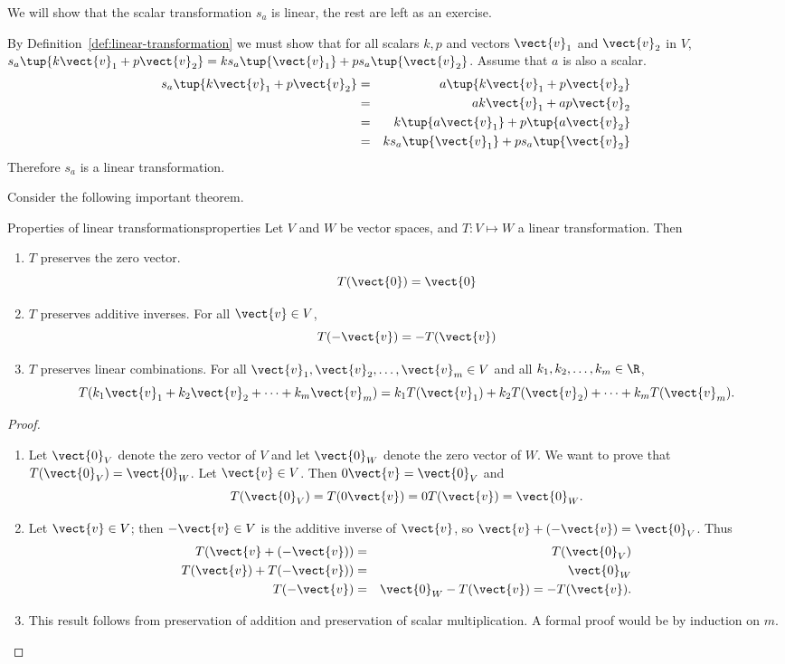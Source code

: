 \begin{solution}
We will show that the scalar transformation $s_a$ is linear, the rest are left as an exercise. 

By Definition~\ref{def:linear-transformation} we must show that for all scalars $k ,p $ and 
vectors $\vect{v}_1$ and $\vect{v}_2$ in $V$, $s_a\tup{k \vect{v}_1 + p \vect{v}_2 } = k s_a\tup{\vect{v}_1}+ p s_a\tup{\vect{v}_{2} }$. Assume that $a$ is also a scalar. 
\begin{eqnarray*}
s_a\tup{k \vect{v}_1 + p \vect{v}_2 } &=& a \tup{k \vect{v}_1 + p \vect{v}_2 } \\
&=&  ak \vect{v}_1 + ap \vect{v}_2  \\
 &=&  k \tup{a \vect{v}_1} + p\tup{a \vect{v}_2}  \\
&=& k s_a\tup{\vect{v}_1 }  + p s_a \tup{\vect{v}_2 }
\end{eqnarray*}
Therefore $s_a$ is a linear transformation.
\end{solution}

Consider the following important theorem.

\begin{theorem}{Properties of linear transformations}{properties}
Let $V$ and $W$ be vector spaces, and $T:V \mapsto W$ a linear
transformation. 
Then
\begin{enumerate}
\item $T$ preserves the zero vector.
\[
T(\vect{0})=\vect{0}
\]
\item $T$ preserves additive inverses. 
For all $\vect{v}\in V$, 
\[
T(-\vect{v})= -T(\vect{v})
\]
\item $T$ preserves linear combinations.
For all $\vect{v}_1, \vect{v}_2, \ldots, \vect{v}_m \in V$ and
all $k_1, k_2, \ldots, k_m\in\R$,
\[ T(k_1\vect{v}_1 + k_2\vect{v}_2 + \cdots + k_m\vect{v}_m)
= k_1T(\vect{v}_1) + k_2T(\vect{v}_2) + \cdots + k_mT(\vect{v}_m).\]
\end{enumerate}
\end{theorem}

\begin{proof}
\begin{enumerate}
\item Let $\vect{0}_V$ denote the zero vector of $V$ and let
$\vect{0}_W$ denote the zero vector of $W$.
We want to prove that $T(\vect{0}_V)=\vect{0}_W$.
Let $\vect{v}\in V$. 
Then $0\vect{v}=\vect{0}_V$ and
\[ T(\vect{0}_V)=T(0\vect{v})=0T(\vect{v})=\vect{0}_W.\]
\item
Let $\vect{v}\in V$; then $-\vect{v}\in V$ is the additive
inverse of $\vect{v}$, so $\vect{v} + (-\vect{v})=\vect{0}_V$.
Thus
\begin{eqnarray*}
T(\vect{v} + (-\vect{v})) & = & T(\vect{0}_V) \\
T(\vect{v}) + T(-\vect{v})) & = & \vect{0}_W \\
T(-\vect{v}) & = & \vect{0}_W - T(\vect{v}) =  - T(\vect{v}).
\end{eqnarray*}
\item This result follows from 
preservation of addition and preservation of scalar multiplication.
A formal proof would be by induction on $m$.
\end{enumerate}
\end{proof}

